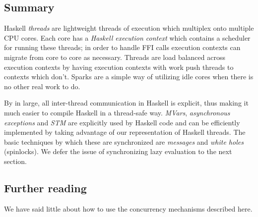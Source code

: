\subsection{Summary}

Haskell \emph{threads} are lightweight threads of execution which
multiplex onto multiple CPU cores.  Each core has a \emph{Haskell
execution context} which contains a scheduler for running these threads;
in order to handle FFI calls execution contexts can migrate from core to
core as necessary.  Threads are load balanced across execution contexts
by having execution contexts with work push threads to contexts which
don't.  Sparks are a simple way of utilizing idle cores when there is no
other real work to do.

By in large, all inter-thread communication in Haskell is explicit, thus
making it much easier to compile Haskell in a thread-safe way.
\emph{MVars}, \emph{asynchronous exceptions} and \emph{STM} are
explicitly used by Haskell code and can be efficiently implemented by
taking advantage of our representation of Haskell threads.  The basic
techniques by which these are synchronized are \emph{messages} and
\emph{white holes} (spinlocks).  We defer the issue of synchronizing
lazy evaluation to the next section.

\subsection{Further reading}

We have said little about how to use the concurrency mechanisms described here. \XXX

